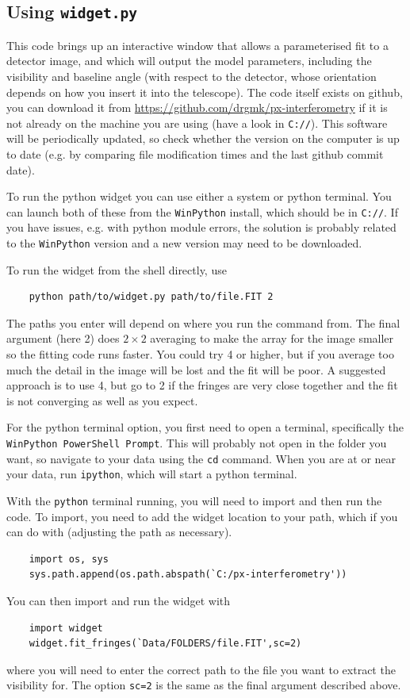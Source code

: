 \documentclass[11pt]{article}
\begin{document}
\subsection{Using \texttt{widget.py}}\label{sec:widget}

This code brings up an interactive window that allows a parameterised fit to a detector image, and which will output the model parameters, including the visibility and baseline angle (with respect to the detector, whose orientation depends on how you insert it into the telescope). The code itself exists on github, you can download it from
\href{https://github.com/drgmk/px-interferometry}{https://github.com/drgmk/px-interferometry} if it is not already on the machine you are using (have a look in \texttt{C://}). This software will be periodically updated, so check whether the version on the computer is up to date (e.g. by comparing file modification times and the last github commit date).

To run the python widget you can use either a system or python terminal. You can launch both of these from the \texttt{WinPython} install, which should be in \texttt{C://}. If you have issues, e.g. with python module errors, the solution is probably related to the \texttt{WinPython} version and a new version may need to be downloaded.

To run the widget from the shell directly, use
\begin{verbatim}
    python path/to/widget.py path/to/file.FIT 2
\end{verbatim}
The paths you enter will depend on where you run the command from.  The final argument (here 2) does $2 \times 2$ averaging to make the array for the image smaller so the fitting code runs faster. You could try 4 or higher, but if you average too much the detail in the image will be lost and the fit will be poor. A suggested approach is to use 4, but go to 2 if the fringes are very close together and the fit is not converging as well as you expect.

For the python terminal option, you first need to open a terminal, specifically the \texttt{WinPython PowerShell Prompt}. This will probably not open in the folder you want, so navigate to your data using the \texttt{cd} command. When you are at or near your data, run \texttt{ipython}, which will start a python terminal.

With the \texttt{python} terminal running, you will need to import and then run the code. To import, you need to add the widget location to your path, which if you can do with (adjusting the path as necessary).
\begin{verbatim}
    import os, sys
    sys.path.append(os.path.abspath(`C:/px-interferometry'))
\end{verbatim}
You can then import and run the widget with
\begin{verbatim}
    import widget
    widget.fit_fringes(`Data/FOLDERS/file.FIT',sc=2)
\end{verbatim}
where you will need to enter the correct path to the file you want to extract the visibility for. The option \texttt{sc=2} is the same as the final argument described above.
\end{document}
